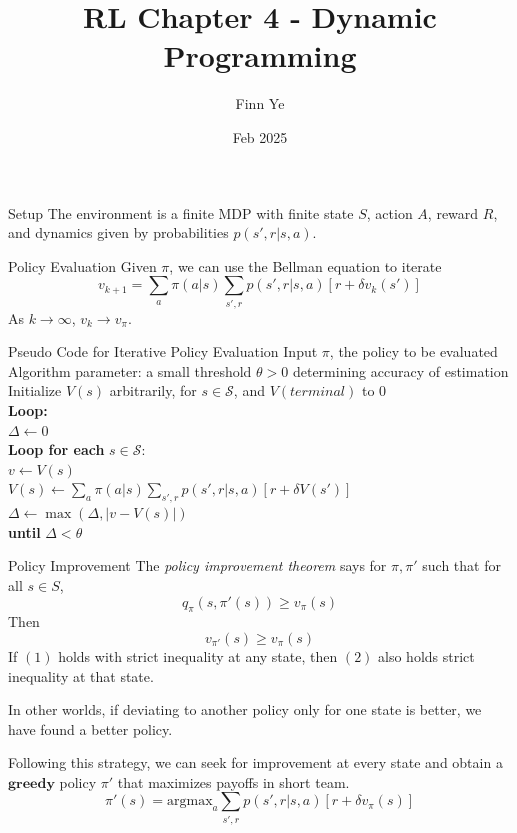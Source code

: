 \documentclass{beamer}
\title{RL Chapter 4 - Dynamic Programming}
\author{Finn Ye}
\date{Feb 2025}
\begin{document}
\frame{\titlepage}

\begin{frame}{Setup}
The environment is a finite MDP with finite state $S$, action $A$, reward $R$, and dynamics given by probabilities $p(s',r|s,a)$.
\end{frame}

\begin{frame}{Policy Evaluation}
    Given $\pi$, we can use the Bellman equation to iterate
    \[
    v_{k+1} = \sum_a \pi(a|s)\sum_{s',r}p(s',r|s,a)[r+\delta v_k(s')]
    \]
    As $k\to\infty$, $v_k\to v_\pi$.
\end{frame}

\begin{frame}{Pseudo Code for Iterative Policy Evaluation}
    \noindent Input $\pi$, the policy to be evaluated \\
    Algorithm parameter: a small threshold $\theta > 0$ determining accuracy of estimation \\
    Initialize $V(s)$ arbitrarily, for $s \in \mathcal{S}$, and $V(\textit{terminal})$ to 0 \\
    
    \noindent \textbf{Loop:} \\
    \quad $\Delta \leftarrow 0$ \\
    \quad \textbf{Loop for each} $s \in \mathcal{S}$: \\
    \quad \quad $v \leftarrow V(s)$ \\
    \quad \quad $V(s) \leftarrow \sum_a \pi(a | s) \sum_{s',r} p(s',r | s,a) \left[ r + \delta V(s') \right]$ \\
    \quad \quad $\Delta \leftarrow \max(\Delta, |v - V(s)|)$ \\
    \textbf{until} $\Delta < \theta$
\end{frame}

\begin{frame}{Policy Improvement}
    The \textit{policy improvement theorem} says for $\pi,\pi'$ such that for all $s\in S$,
    \[
    q_\pi(s,\pi'(s))\geq v_\pi(s) \tag{1}
    \]
    Then 
    \[
    v_{\pi'}(s)\geq v_{\pi}(s) \tag{2}
    \]
    If $(1)$ holds with strict inequality at any state, then $(2)$ also holds strict inequality at that state.

    In other worlds, if deviating to another policy only for one state is better, we have found a better policy.

    Following this strategy, we can seek for improvement at every state and obtain a $\textbf{greedy}$ policy $\pi'$ that maximizes payoffs in short team.
    \[
    \pi'(s) = \text{argmax}_a \sum_{s',r}p(s',r|s,a)[r+\delta v_\pi(s)]
    \]
\end{frame}
\end{document}
